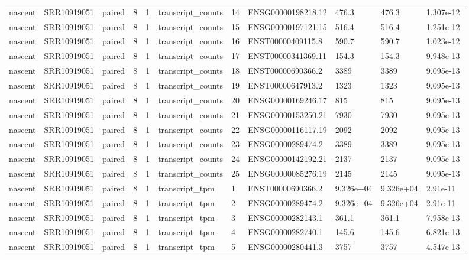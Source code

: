 \begin{tabular}{lllllllllll}
nascent & SRR10919051 & paired & 8 & 1 & transcript\_counts & 14 & ENSG00000198218.12 & 476.3 & 476.3 & 1.307e-12 \\
nascent & SRR10919051 & paired & 8 & 1 & transcript\_counts & 15 & ENSG00000197121.15 & 516.4 & 516.4 & 1.251e-12 \\
nascent & SRR10919051 & paired & 8 & 1 & transcript\_counts & 16 & ENST00000409115.8 & 590.7 & 590.7 & 1.023e-12 \\
nascent & SRR10919051 & paired & 8 & 1 & transcript\_counts & 17 & ENST00000341369.11 & 154.3 & 154.3 & 9.948e-13 \\
nascent & SRR10919051 & paired & 8 & 1 & transcript\_counts & 18 & ENST00000690366.2 & 3389 & 3389 & 9.095e-13 \\
nascent & SRR10919051 & paired & 8 & 1 & transcript\_counts & 19 & ENST00000647913.2 & 1323 & 1323 & 9.095e-13 \\
nascent & SRR10919051 & paired & 8 & 1 & transcript\_counts & 20 & ENSG00000169246.17 & 815 & 815 & 9.095e-13 \\
nascent & SRR10919051 & paired & 8 & 1 & transcript\_counts & 21 & ENSG00000153250.21 & 7930 & 7930 & 9.095e-13 \\
nascent & SRR10919051 & paired & 8 & 1 & transcript\_counts & 22 & ENSG00000116117.19 & 2092 & 2092 & 9.095e-13 \\
nascent & SRR10919051 & paired & 8 & 1 & transcript\_counts & 23 & ENSG00000289474.2 & 3389 & 3389 & 9.095e-13 \\
nascent & SRR10919051 & paired & 8 & 1 & transcript\_counts & 24 & ENSG00000142192.21 & 2137 & 2137 & 9.095e-13 \\
nascent & SRR10919051 & paired & 8 & 1 & transcript\_counts & 25 & ENSG00000085276.19 & 2145 & 2145 & 9.095e-13 \\
nascent & SRR10919051 & paired & 8 & 1 & transcript\_tpm & 1 & ENST00000690366.2 & 9.326e+04 & 9.326e+04 & 2.91e-11 \\
nascent & SRR10919051 & paired & 8 & 1 & transcript\_tpm & 2 & ENSG00000289474.2 & 9.326e+04 & 9.326e+04 & 2.91e-11 \\
nascent & SRR10919051 & paired & 8 & 1 & transcript\_tpm & 3 & ENSG00000282143.1 & 361.1 & 361.1 & 7.958e-13 \\
nascent & SRR10919051 & paired & 8 & 1 & transcript\_tpm & 4 & ENSG00000282740.1 & 145.6 & 145.6 & 6.821e-13 \\
nascent & SRR10919051 & paired & 8 & 1 & transcript\_tpm & 5 & ENSG00000280441.3 & 3757 & 3757 & 4.547e-13 \\

\end{tabular}
